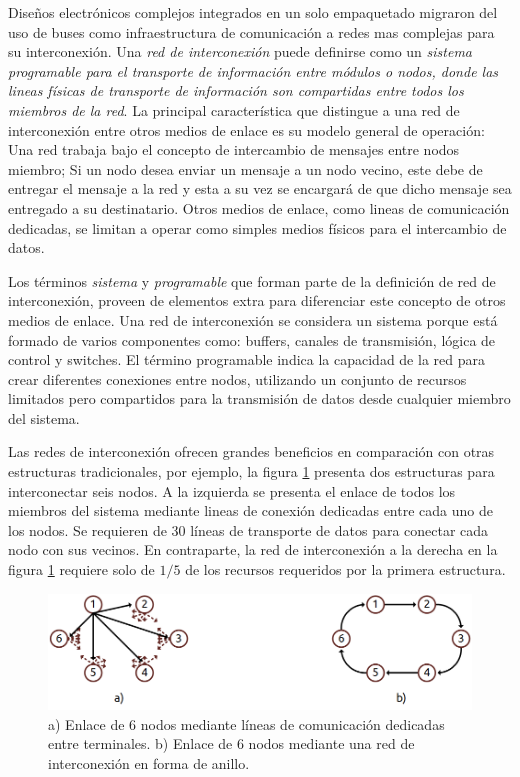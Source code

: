 Diseños electrónicos complejos integrados en un solo empaquetado migraron del uso de buses como infraestructura de comunicación a redes mas complejas para su interconexión. Una \emph{red de interconexión} puede definirse como un \emph{sistema programable para el transporte de información entre módulos o nodos, donde las lineas físicas de transporte de información son compartidas entre todos los miembros de la red}. La principal característica que distingue a una red de interconexión entre otros medios de enlace es su modelo general de operación: Una red trabaja bajo el concepto de intercambio de mensajes entre nodos miembro; Si un nodo desea enviar un mensaje a un nodo vecino, este debe de entregar el mensaje a la red y esta a su vez se encargará de que dicho mensaje sea entregado a su destinatario. Otros medios de enlace, como lineas de comunicación dedicadas, se limitan a operar como simples medios físicos para el intercambio de datos.

Los términos \textit{sistema} y \textit{programable} que forman parte de la definición de red de interconexión, proveen de elementos extra para diferenciar este concepto de otros medios de enlace. Una red de interconexión se considera un sistema porque está formado de varios componentes como: buffers, canales de transmisión, lógica de control y switches. El término programable indica la capacidad de la red para crear diferentes conexiones entre nodos, utilizando un conjunto de recursos limitados pero compartidos para la transmisión de datos desde cualquier miembro del sistema.

Las redes de interconexión ofrecen grandes beneficios en comparación con otras estructuras tradicionales, por ejemplo, la figura \ref{fig:ch1_enlaces_dedicados} presenta dos estructuras para interconectar seis nodos. A la izquierda se presenta el enlace de todos los miembros del sistema mediante lineas de conexión dedicadas entre cada uno de los nodos. Se requieren de 30 líneas de transporte de datos para conectar cada nodo con sus vecinos. En contraparte, la red de interconexión a la derecha en la figura \ref{fig:ch1_enlaces_dedicados} requiere solo de $1/5$ de los recursos requeridos por la primera estructura. 

\begin{figure}
	\begin{center}
		\includegraphics[scale=0.7]{figures/ch1_enlaces_dedicados.png}
	\end{center}
	\caption
		{	
			a) Enlace de 6 nodos mediante líneas de comunicación dedicadas entre terminales. b) Enlace de 6 nodos mediante una red de interconexión en forma de anillo.
		}
	\label{fig:ch1_enlaces_dedicados}
\end{figure}

